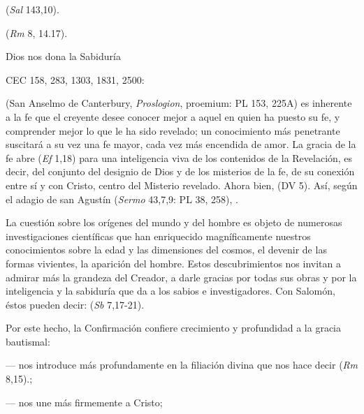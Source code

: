 	 (\emph{Sal} 143,10).
	
	 (\emph{Rm} 8, 14.17).
	
	Dios nos dona la Sabiduría
	
	CEC 158, 283, 1303, 1831, 2500:
	
	  (San Anselmo de Canterbury, \emph{Proslogion}, proemium: PL 153, 225A) es inherente a la fe que el creyente desee conocer mejor a aquel en quien ha puesto su fe, y comprender mejor lo que le ha sido revelado; un conocimiento más penetrante suscitará a su vez una fe mayor, cada vez más encendida de amor. La gracia de la fe abre  (\emph{Ef} 1,18) para una inteligencia viva de los contenidos de la Revelación, es decir, del conjunto del designio de Dios y de los misterios de la fe, de su conexión entre sí y con Cristo, centro del Misterio revelado. Ahora bien,  (DV 5). Así, según el adagio de san Agustín (\emph{Sermo} 43,7,9: PL 38, 258), .
	
	 La cuestión sobre los orígenes del mundo y del hombre es objeto de numerosas investigaciones científicas que han enriquecido magníficamente nuestros conocimientos sobre la edad y las dimensiones del cosmos, el devenir de las formas vivientes, la aparición del hombre. Estos descubrimientos nos invitan a admirar más la grandeza del Creador, a darle gracias por todas sus obras y por la inteligencia y la sabiduría que da a los sabios e investigadores. Con Salomón, éstos pueden decir:  (\emph{Sb} 7,17-21).
	
	 Por este hecho, la Confirmación confiere crecimiento y profundidad a la gracia bautismal:
	
	--- nos introduce más profundamente en la filiación divina que nos hace decir  (\emph{Rm} 8,15).;
	
	--- nos une más firmemente a Cristo;
	
